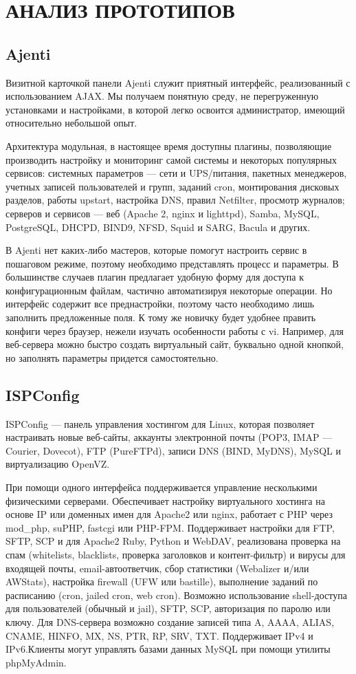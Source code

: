 \section{АНАЛИЗ ПРОТОТИПОВ}
\label{sec:solution}

\subsection{Ajenti}
Визитной карточкой панели Ajenti служит приятный интерфейс, реализованный с использованием AJAX. Мы получаем понятную среду, не перегруженную установками и настройками, в которой легко освоится администратор, имеющий относительно небольшой опыт. 

Архитектура модульная, в настоящее время доступны плагины, позволяющие производить настройку и мониторинг самой системы и некоторых популярных сервисов: системных параметров — сети и UPS/питания, пакетных менеджеров, учетных записей пользователей и групп, заданий cron, монтирования дисковых разделов, работы upstart, настройка DNS, правил Netfilter, просмотр журналов; серверов и сервисов — веб (Apache 2, nginx и lighttpd), Samba, MySQL, PostgreSQL, DHCPD, BIND9, NFSD, Squid и SARG, Bacula и других.

В Ajenti нет каких-либо мастеров, которые помогут настроить сервис в пошаговом режиме, поэтому необходимо представлять процесс и параметры. В большинстве случаев плагин предлагает удобную форму для доступа к конфигурационным файлам, частично автоматизируя некоторые операции. Но интерфейс содержит все преднастройки, поэтому часто необходимо лишь заполнить предложенные поля. К тому же новичку будет удобнее править конфиги через браузер, нежели изучать особенности работы с vi. Например, для веб-сервера можно быстро создать виртуальный сайт, буквально одной кнопкой, но заполнять параметры придется самостоятельно.

\subsection{ISPConfig} 
ISPConfig — панель управления хостингом для Linux, которая позволяет настраивать новые веб-сайты, аккаунты электронной почты (POP3, IMAP — Courier, Dovecot), FTP (PureFTPd), записи DNS (BIND, MyDNS), MySQL и виртуализацию OpenVZ. 

При помощи одного интерфейса поддерживается управление несколькими физическими серверами. Обеспечивает настройку виртуального хостинга на основе IP или доменных имен для Apache2 или nginx, работает с PHP через mod\_php, suPHP, fastcgi или PHP-FPM. Поддерживает настройки для FTP, SFTP, SCP и для Apache2 Ruby, Python и WebDAV, реализована проверка на спам (whitelists, blacklists, проверка заголовков и контент-фильтр) и вирусы для входящей почты, email-автоответчик, сбор статистики (Webalizer и/или AWStats), настройка firewall (UFW или bastille), выполнение заданий по расписанию (cron, jailed cron, web cron). Возможно использование shell-доступа для пользователей (обычный и jail), SFTP, SCP, авторизация по паролю или ключу. Для DNS-сервера возможно создание записей типа A, AAAA, ALIAS, CNAME, HINFO, MX, NS, PTR, RP, SRV, TXT. Поддерживает IPv4 и IPv6.Клиенты могут управлять базами данных MySQL при помощи утилиты phpMyAdmin.

